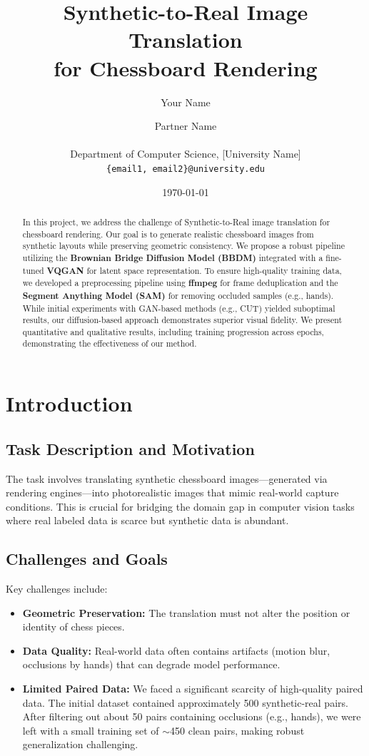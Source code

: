 \documentclass[12pt,a4paper]{article}
\title{\textbf{Synthetic-to-Real Image Translation\\for Chessboard Rendering}}
\author{
    Your Name \and 
    Partner Name \\
    \\
    Department of Computer Science, [University Name]\\
    \texttt{\{email1, email2\}@university.edu}
}
\date{\today}
\begin{document}
\maketitle

\begin{abstract}
In this project, we address the challenge of Synthetic-to-Real image translation for chessboard rendering. Our goal is to generate realistic chessboard images from synthetic layouts while preserving geometric consistency. We propose a robust pipeline utilizing the \textbf{Brownian Bridge Diffusion Model (BBDM)} integrated with a fine-tuned \textbf{VQGAN} for latent space representation. To ensure high-quality training data, we developed a preprocessing pipeline using \textbf{ffmpeg} for frame deduplication and the \textbf{Segment Anything Model (SAM)} for removing occluded samples (e.g., hands). While initial experiments with GAN-based methods (e.g., CUT) yielded suboptimal results, our diffusion-based approach demonstrates superior visual fidelity. We present quantitative and qualitative results, including training progression across epochs, demonstrating the effectiveness of our method.
\end{abstract}

\section{Introduction}
\label{sec:introduction}

\subsection{Task Description and Motivation}
The task involves translating synthetic chessboard images—generated via rendering engines—into photorealistic images that mimic real-world capture conditions. This is crucial for bridging the domain gap in computer vision tasks where real labeled data is scarce but synthetic data is abundant.

\subsection{Challenges and Goals}
Key challenges include:
\begin{itemize}
    \item \textbf{Geometric Preservation:} The translation must not alter the position or identity of chess pieces.
    \item \textbf{Data Quality:} Real-world data often contains artifacts (motion blur, occlusions by hands) that can degrade model performance.
    \item \textbf{Limited Paired Data:} We faced a significant scarcity of high-quality paired data. The initial dataset contained approximately 500 synthetic-real pairs. After filtering out about 50 pairs containing occlusions (e.g., hands), we were left with a small training set of $\sim$450 clean pairs, making robust generalization challenging.
\end{itemize}
\end{document}
